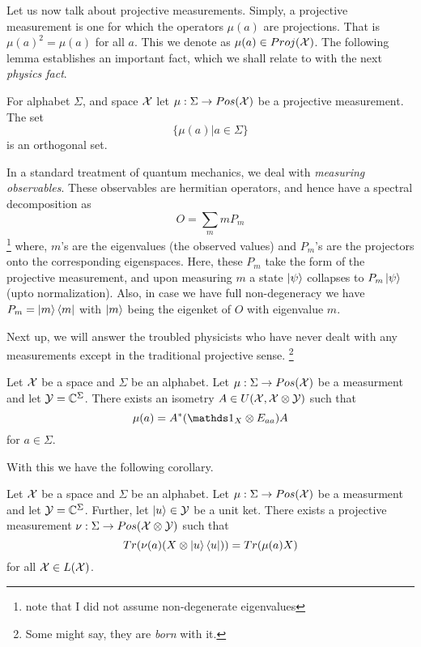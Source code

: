 Let us now talk about projective measurements. Simply, a projective measurement is one for which the operators $\mu(a)$ are projections. That is $\mu(a)^2 = \mu(a)$ for all $a$. This we denote as $\mu(a)\in Proj(\mathcal{X})$. The following lemma establishes an important fact, which we shall relate to with the next \textit{physics fact}.
\begin{lemma}
For alphabet $\Sigma$, and space $\mathcal{X}$ let $\mu:\Sigma\to Pos(\mathcal{X})$ be a projective measurement. The set
\[\{\mu(a)|a\in\Sigma\}\]
is an orthogonal set.
\end{lemma}
\begin{pfact}
In a standard treatment of quantum mechanics, we deal with \textit{measuring observables}. These observables are hermitian operators, and hence have a spectral decomposition as 
\[O = \sum_mmP_m\]\footnote{note that I did not assume non-degenerate eigenvalues}
where, $m$'s are the eigenvalues (the observed values) and $P_m$'s are the projectors onto the corresponding eigenspaces. Here, these $P_m$ take the form of the projective measurement, and upon measuring $m$ a state $\ket{\psi}$ collapses to $P_m\ket{\psi}$ (upto normalization). Also, in case we have full non-degeneracy we have $P_m = \ket{m}\bra{m}$ with $\ket{m}$ being the eigenket of $O$ with eigenvalue $m$.
\end{pfact}
Next up, we will answer the troubled physicists who have never dealt with any measurements except in the traditional projective sense. \footnote{Some might say, they are \textit{born} with it.}
\begin{theorem}
Let $\mathcal{X}$ be a space and $\Sigma$ be an alphabet. Let $\mu:\Sigma\to Pos(\mathcal{X})$ be a measurment and let $\mathcal{Y} = \mathbb{C}^{\Sigma}$. There exists an isometry $A \in U(\mathcal{X},\mathcal{X}\otimes\mathcal{Y})$ such that
\[\mu(a) = A^*(\iden_X\otimes E_{aa})A\] 
for $a\in\Sigma$.
\end{theorem}
With this we have the following corollary.
\begin{corollary}
Let $\mathcal{X}$ be a space and $\Sigma$ be an alphabet. Let $\mu:\Sigma\to Pos(\mathcal{X})$ be a measurment and let $\mathcal{Y} = \mathbb{C}^{\Sigma}$. Further, let $\ket{u}\in\mathcal{Y}$ be a unit ket. There exists a projective measurement $\nu:\Sigma\to Pos(\mathcal{X}\otimes\mathcal{Y})$ such that
\[Tr(\nu(a)(X\otimes \ket{u}\bra{u})) = Tr(\mu(a)X)\]
for all $\mathcal{X}\in L(\mathcal{X})$.
\end{corollary}
